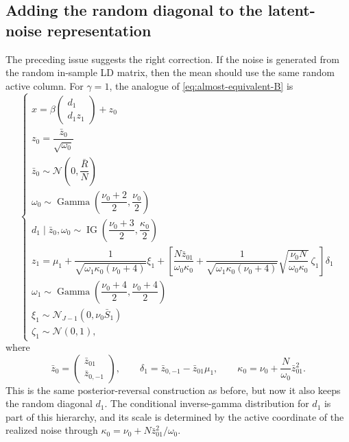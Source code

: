 \documentclass[11pt]{article}
\newcommand{\IG}{\operatorname{IG}}
\newcommand{\Gam}{\operatorname{Gamma}}
\newcommand{\Normal}{\mathcal N}
\begin{document}
\subsection{Adding the random diagonal to the latent-noise representation}
The preceding issue suggests the right correction. If the noise is generated
from the random in-sample LD matrix, then the mean should use the same random
active column. For $\gamma=1$, the analogue of
\eqref{eq:almost-equivalent-B} is
\begin{equation}\label{eq:equivalent-A-like-almost-B}
\begin{cases}
x = \beta \begin{pmatrix} d_1 \\ d_1z_1\end{pmatrix} + z_0\\
z_0 = \dfrac{\bar z_0}{\sqrt{\omega_0}}\\
\bar z_0 \sim \Normal\left(0,\dfrac{\bar R}{N}\right)\\
\omega_0 \sim \Gam\left(\dfrac{\nu_0 + 2}{2},\dfrac{\nu_0}{2}\right)\\
d_1\mid \bar z_0,\omega_0
\sim
\IG\left(\dfrac{\nu_0+3}{2},\dfrac{\kappa_0}{2}\right)\\
z_1 = \mu_1 +\dfrac{1}{\sqrt{\omega_1\kappa_0(\nu_0+4)}}\xi_1
+\left[
\dfrac{N\bar z_{01}}{\omega_0\kappa_0}
+\dfrac{1}{\sqrt{\omega_1\kappa_0(\nu_0+4)}}
\sqrt{\dfrac{\nu_0 N}{\omega_0\kappa_0}}\,\zeta_1\right]\delta_1 \\
\omega_1\sim\Gam\left(\dfrac{\nu_0+4}{2},\dfrac{\nu_0+4}{2}\right)\\
\xi_1\sim\Normal_{J-1}(0,\nu_0\bar S_1)\\
\zeta_1\sim\Normal(0,1),
\end{cases}
\end{equation}
where
\[
\bar z_0=
\begin{pmatrix}
\bar z_{01}\\ \bar z_{0,-1}
\end{pmatrix},
\qquad
\delta_1=\bar z_{0,-1}-\bar z_{01}\mu_1,
\qquad
\kappa_0=\nu_0+\frac{N}{\omega_0}\bar z_{01}^2.
\]
This is the same posterior-reversal construction as before, but now it also
keeps the random diagonal $d_1$. The conditional inverse-gamma distribution for
$d_1$ is part of this hierarchy, and its scale is determined by the active
coordinate of the realized noise through
$\kappa_0=\nu_0+N\bar z_{01}^2/\omega_0$.
\end{document}
